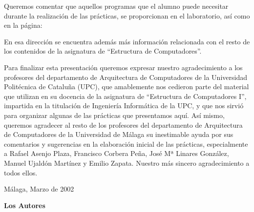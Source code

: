 \newpage
Queremos comentar que aquellos  programas que el alumno puede necesitar durante la
realización de las prácticas, se proporcionan en el laboratorio, así
como en la página:

\vspace{2mm} 
\vspace{1mm}                                                    

En esa dirección se encuentra además más información relacionada con
el resto de los contenidos de la asignatura de ``Estructura de
Computadores''.

Para finalizar esta presentación queremos expresar nuestro
agradecimiento a los profesores del departamento de Arquitectura de
Computadores de la Universidad Politécnica de Cataluña (UPC), que
amablemente nos cedieron parte del material que utilizan en su
docencia de la asignatura de ``Estructura de Computadores I'',
impartida en la titulación de Ingeniería Informática de la UPC, y que
nos sirvió para organizar algunas de las prácticas que presentamos
aquí. Así mismo, queremos agradecer al resto de los profesores del
departamento de Arquitectura de Computadores de la Universidad de
Málaga su inestimable ayuda por sus comentarios y sugerencias en la
elaboración inicial de las prácticas, especialmente a Rafael Asenjo
Plaza, Francisco Corbera Peña, José Mª Linares González, Manuel
Ujaldón Martínez y Emilio Zapata. Nuestro más sincero agradecimiento a
todos ellos.
 
\vspace{0.5cm}
 
\hfill{Málaga, Marzo de 2002}   

\vspace{0.8cm}

\hfill{\large \bf Los Autores}
\chapterend
